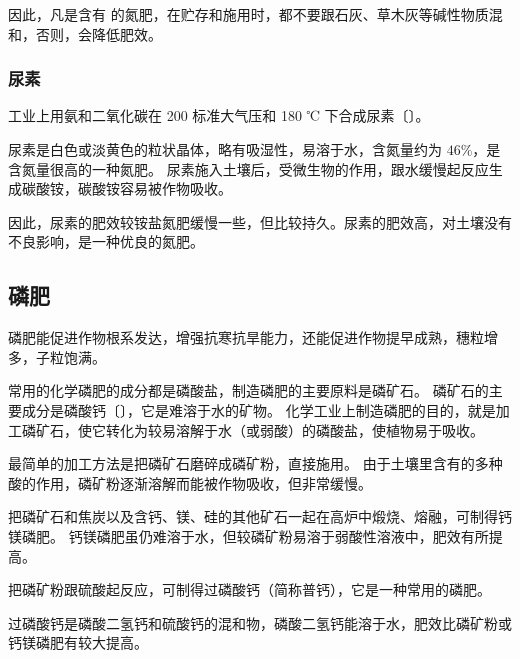 因此，凡是含有  的氮肥，在贮存和施用时，都不要跟石灰、草木灰等碱性物质混和，否则，会降低肥效。


\subsubsection{尿素}

工业上用氨和二氧化碳在 200 标准大气压和 180 ℃ 下合成尿素〔〕。
\begin{fangchengshi}
\end{fangchengshi}

尿素是白色或淡黄色的粒状晶体，略有吸湿性，易溶于水，含氮量约为 $46\%$，是含氮量很高的一种氮肥。
尿素施入土壤后，受微生物的作用，跟水缓慢起反应生成碳酸铵，碳酸铵容易被作物吸收。
\begin{fangchengshi}
\end{fangchengshi}

因此，尿素的肥效较铵盐氮肥缓慢一些，但比较持久。尿素的肥效高，对土壤没有不良影响，是一种优良的氮肥。



\subsection{磷肥}

磷肥能促进作物根系发达，增强抗寒抗旱能力，还能促进作物提早成熟，穗粒增多，子粒饱满。

常用的化学磷肥的成分都是磷酸盐，制造磷肥的主要原料是磷矿石。
磷矿石的主要成分是磷酸钙〔〕，它是难溶于水的矿物。
化学工业上制造磷肥的目的，就是加工磷矿石，使它转化为较易溶解于水（或弱酸）的磷酸盐，使植物易于吸收。

最简单的加工方法是把磷矿石磨碎成磷矿粉，直接施用。
由于土壤里含有的多种酸的作用，磷矿粉逐渐溶解而能被作物吸收，但非常缓慢。

把磷矿石和焦炭以及含钙、镁、硅的其他矿石一起在高炉中煅烧、熔融，可制得钙镁磷肥。
钙镁磷肥虽仍难溶于水，但较磷矿粉易溶于弱酸性溶液中，肥效有所提高。

把磷矿粉跟硫酸起反应，可制得过磷酸钙（简称普钙），它是一种常用的磷肥。
\begin{fangchengshi}
\end{fangchengshi}

过磷酸钙是磷酸二氢钙和硫酸钙的混和物，磷酸二氢钙能溶于水，肥效比磷矿粉或钙镁磷肥有较大提高。

